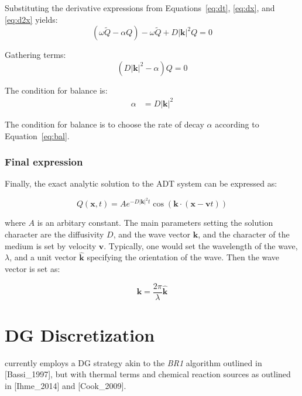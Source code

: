 \documentclass[11pt]{article}
\renewcommand{\vec}[1]{\bm{#1}}
\begin{document}
Substituting the derivative expressions from Equations~\ref{eq:dt}, \ref{eq:dx}, and \ref{eq:d2x} yields:
\[
\left(\omega \tilde{Q} - \alpha Q\right) - \omega \tilde{Q} + D|\vec{k}|^2 Q = 0
\]

Gathering terms:
\begin{equation}
  (D|\vec{k}|^2 - \alpha)Q = 0
  \label{eq:condition}
\end{equation}

The condition for balance is:
\begin{equation}
\begin{aligned}
\alpha & = D |\vec{k}|^2
\end{aligned}
\label{eq:bal}
\end{equation}

The condition for balance is to choose the rate of decay $\alpha$ according to Equation~\ref{eq:bal}.

\subsubsection{Final expression}

Finally, the exact analytic solution to the ADT system can be expressed as:

\begin{equation}
  Q(\vec{x}, t) = A e^{-D|\vec{k}|^2 t} \cos\left(\vec{k} \cdot (\vec{x} - \vec{v} t)\right)
  \label{eq:phi}
\end{equation}

where $A$ is an arbitary constant.  The main parameters setting the solution character are the diffusivity $D$, and the wave vector $\vec{k}$, and the character of the medium is set by velocity $\vec{v}$.  Typically, one would set the wavelength of the wave, $\lambda$, and a unit vector $\hat{\vec{k}}$ specifying the orientation of the wave. Then the wave vector is set as:

\begin{equation}
  \vec{k} = \frac{2\pi}{\lambda}\hat{\vec{k}}
\end{equation}

\section{DG Discretization}


\ceesdcode{} currently employs a DG strategy akin to the \textit{BR1} algorithm outlined in
[Bassi\_1997], but with thermal terms and chemical reaction sources as outlined in
[Ihme\_2014] and [Cook\_2009].
\end{document}
